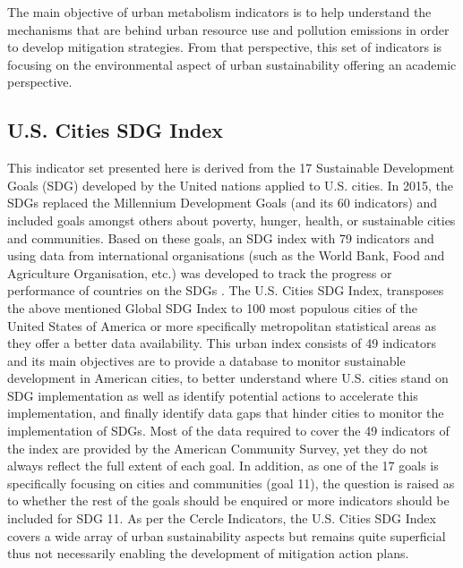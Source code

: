 \documentclass[preprint,12pt]{elsarticle}
\begin{document}
The main objective of urban metabolism indicators is to help understand the mechanisms that are behind urban resource use and pollution emissions in order to develop mitigation strategies. From that perspective, this set of indicators is focusing on the environmental aspect of urban sustainability offering an academic perspective.

\subsection{U.S. Cities SDG Index}
This indicator set presented here is derived from the 17 Sustainable Development Goals (SDG) developed by the United nations applied to U.S. cities. In 2015, the SDGs replaced the Millennium Development Goals (and its 60 indicators) and included goals amongst others about poverty, hunger, health, or sustainable cities and communities. Based on these goals, an SDG index with 79 indicators and using data from international organisations (such as the World Bank, Food and Agriculture Organisation, etc.) was developed to track the progress or performance of countries on the SDGs \cite{sachs2016sdg}. The U.S. Cities SDG Index, transposes the above mentioned Global SDG Index to 100 most populous cities of the United States of America or more specifically metropolitan statistical areas as they offer a better data availability. This urban index consists of 49 indicators and its main objectives are to provide a database to monitor sustainable development in American cities, to better understand where U.S. cities stand on SDG implementation as well as identify potential actions to accelerate this implementation, and finally identify data gaps that hinder cities to monitor the implementation of SDGs. Most of the data required to cover the 49 indicators of the index are provided by the American Community Survey, yet they do not always reflect the full extent of each goal. In addition, as one of the 17 goals is specifically focusing on cities and communities (goal 11), the question is raised as to whether the rest of the goals should be enquired or more indicators should be included for SDG 11. As per the Cercle Indicators, the U.S. Cities SDG Index covers a wide array of urban sustainability aspects but remains quite superficial thus not necessarily enabling the development of mitigation action plans.




 
\end{document}
